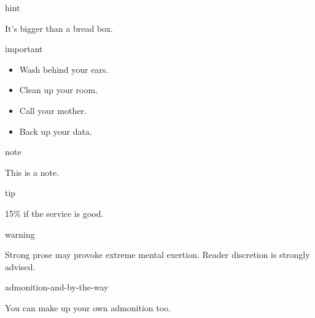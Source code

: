 \documentclass[a4paper]{article}
\begin{document}
\begin{DUclass}{hint}
\begin{DUadmonition}

It’s bigger than a bread box.
\end{DUadmonition}
\end{DUclass}

\begin{DUclass}{important}
\begin{DUadmonition}

\begin{itemize}
\item Wash behind your ears.

\item Clean up your room.

\item Call your mother.

\item Back up your data.
\end{itemize}
\end{DUadmonition}
\end{DUclass}

\begin{DUclass}{note}
\begin{DUadmonition}

This is a note.
\end{DUadmonition}
\end{DUclass}

\begin{DUclass}{tip}
\begin{DUadmonition}

15\% if the service is good.
\end{DUadmonition}
\end{DUclass}

\begin{DUclass}{warning}
\begin{DUadmonition}

Strong prose may provoke extreme mental exertion.
Reader discretion is strongly advised.
\end{DUadmonition}
\end{DUclass}

\begin{DUclass}{admonition-and-by-the-way}
\begin{DUadmonition}

You can make up your own admonition too.
\end{DUadmonition}
\end{DUclass}
\end{document}
